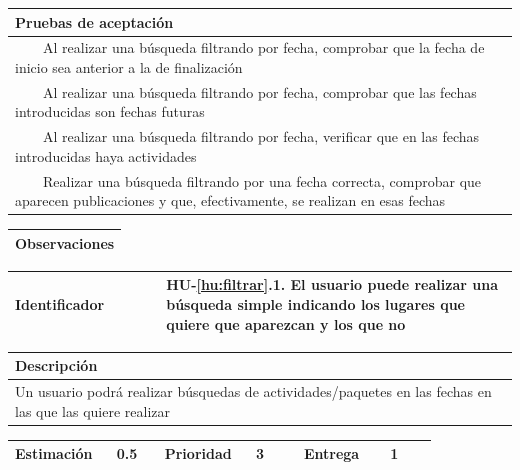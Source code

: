 \documentclass[11pt]{article}
\newcommand{\tabitem}{~~\llap{\textbullet}~~}
\begin{document}
  \begin{longtable}{p{1.028\linewidth}}
    \textbf{Pruebas de aceptación}\\
    \midrule
    \tabitem Al realizar una búsqueda filtrando por fecha, comprobar que la fecha de inicio sea anterior a la de finalización\\
    \tabitem Al realizar una búsqueda filtrando por fecha, comprobar que las fechas introducidas son fechas futuras\\
    \tabitem Al realizar una búsqueda filtrando por fecha, verificar que en las fechas introducidas haya actividades\\
    \tabitem Realizar una búsqueda filtrando por una fecha correcta, comprobar que aparecen publicaciones y que, efectivamente, se realizan en esas fechas\\
\end{longtable}
\begin{longtable}{p{1.028\linewidth}}
  \textbf{Observaciones}\\
  \midrule
  \bottomrule
  \bottomrule
\end{longtable}


\centering
\begin{longtable}{p{0.3\linewidth}|p{0.7\linewidth}}
	\toprule
	\toprule
	\textbf{Identificador} & \textbf{HU-\ref{hu:filtrar}.1}. El usuario puede realizar una búsqueda simple indicando los lugares que quiere que aparezcan y los que no\\
	
	\bottomrule
\end{longtable}

\begin{longtable}{p{1.028\linewidth}}
	\textbf{Descripción}\\
	\midrule
	Un usuario podrá realizar búsquedas de actividades/paquetes en las fechas en las que las quiere realizar
\end{longtable}
\begin{longtable}{p{0.18\linewidth}|p{0.1\linewidth}|p{0.18\linewidth}|p{0.1\linewidth}|p{0.18\linewidth}|p{0.1\linewidth}}
	\toprule
	\textbf{Estimación} & 0.5 & \textbf{Prioridad} & 3 & \textbf{Entrega} & 1 \\
	\bottomrule
\end{longtable}
\end{document}
